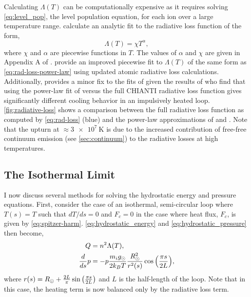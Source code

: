 Calculating $\Lambda(T)$ can be computationally expensive as it requires solving \autoref{eq:level_pop}, the level population equation, for each ion over a large temperature range. \citet{rosner_dynamics_1978} calculate an analytic fit to the radiative loss function of the form,
\begin{equation}\label{eq:rad-loss-power-law}
    \Lambda(T) = \chi T^\alpha,
\end{equation}
where $\chi$ and $\alpha$ are piecewise functions in $T$. The values of $\alpha$ and $\chi$ are given in Appendix A of \citet{rosner_dynamics_1978}. \citet{klimchuk_highly_2008} provide an improved piecewise fit to $\Lambda(T)$ of the same form as \autoref{eq:rad-loss-power-law} using updated atomic radiative loss calculations. Additionally, \citet{cargill_active_2014} provides a minor fix to the fits of \citet{klimchuk_highly_2008} given the results of \citet{reale_role_2012} who find that using the power-law fit of \citet{rosner_dynamics_1978} versus the full CHIANTI radiative loss function gives significantly different cooling behavior in an impulsively heated loop. \autoref{fig:radiative-loss} shows a comparison between the full radiative loss function as computed by \autoref{eq:rad-loss} (blue) and the power-law approximations of \citet[orange]{klimchuk_highly_2008} and \citet[green]{rosner_dynamics_1978}. Note that the upturn at $\approx\SI{3e7}{\kelvin}$ is due to the increased contribution of free-free continuum emission (see \autoref{sec:continuum}) to the radiative losses at high temperatures.

\subsection{The Isothermal Limit}\label{sec:isothermal}

I now discuss several methods for solving the hydrostatic energy and pressure equations. First, consider the case of an isothermal, semi-circular loop where $T(s)=T$ such that $dT/ds=0$ and $F_c=0$ in the case where heat flux, $F_c$, is given by \autoref{eq:spitzer-harm}. \autoref{eq:hydrostatic_energy} and \autoref{eq:hydrostatic_pressure} then become,
\begin{align}
Q &= n^2\Lambda(T), \\
\frac{d}{ds}p &= -p\frac{m_ig_\odot}{2k_BT}\frac{R_\odot^2}{r^2(s)}\cos{\left(\frac{\pi s}{2L}\right)},
\end{align}
where $r(s) = R_\odot + \frac{2L}{\pi}\sin{\left(\frac{\pi s}{2L}\right)}$ and $L$ is the half-length of the loop. Note that in this case, the heating term is now balanced only by the radiative loss term. 

